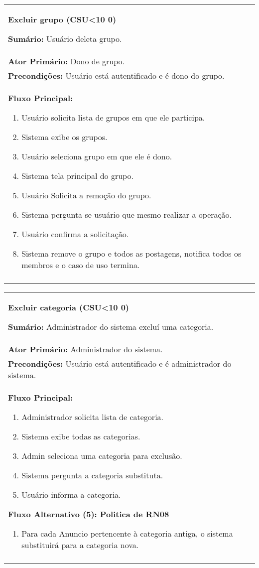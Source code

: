 \documentclass{article}
\newcounter{cscounter}
\newcommand{\sumario}[1] {\textbf{Sumário:} #1\\ }
\newcommand{\ator}[1] {\textbf{Ator Primário:} #1\\}
\newcommand{\precond}[1] {\textbf{Precondições:} #1\\}
\newcommand{\fluxo}{\textbf{Fluxo Principal:}}
\newenvironment{fluxoa}[2]
	{
		\textbf{Fluxo Alternativo (#1): #2}
		\begin{enumerate}[itemsep=0mm, label=(\alph*)]			
	}
	{
		\end{enumerate}			
	}
\newenvironment{casosdeuso}[1]
{
 \stepcounter{cscounter}
 \begin{center}
 \begin{tabular}{|p{\textwidth}|}
 \hline
 \begin{center}
 \large \textbf{#1 (CSU\ifnum\value{cscounter}<10 0\fi\arabic{cscounter})}
 \end{center}
}
{ 
 \\\\\hline
 \end{tabular} 
 \end{center}
}
\begin{document}
\begin{casosdeuso}{Excluir grupo}
 \sumario{Usuário deleta grupo.}
 \ator{Dono de grupo.}
 \precond{Usuário está autentificado e é dono do grupo.}
\fluxo
\begin{enumerate}[itemsep=0mm]
 \item Usuário solicita lista de grupos em que ele participa.
 \item Sistema exibe os grupos.
 \item Usuário seleciona grupo em que ele é dono.
 \item Sistema tela principal do grupo.
 \item Usuário Solicita a remoção do grupo.
 \item Sistema pergunta se usuário que mesmo realizar a operação.
 \item Usuário confirma a solicitação.
 \item Sistema remove o grupo e todos as postagens, notifica todos os membros e o caso de uso termina.
\end{enumerate}
\end{casosdeuso}
 
\begin{casosdeuso}{Excluir categoria}
 \sumario{Administrador do sistema excluí uma categoria.}
 \ator{Administrador do sistema.}
 \precond{Usuário está autentificado e é administrador do sistema.}
\fluxo
\begin{enumerate}[itemsep=0mm]
 \item Administrador solicita lista de categoria.
 \item Sistema exibe todas as categorias.
 \item Admin seleciona uma categoria  para exclusão.
 \item Sistema pergunta a categoria substituta.
 \item Usuário informa a categoria.
 \end{enumerate}
 \begin{fluxoa}{5}{Politica de RN08}
  \item Para cada Anuncio pertencente à categoria antiga, o sistema substituirá para a categoria nova.
  \end{fluxoa}
\end{casosdeuso}
\end{document}
